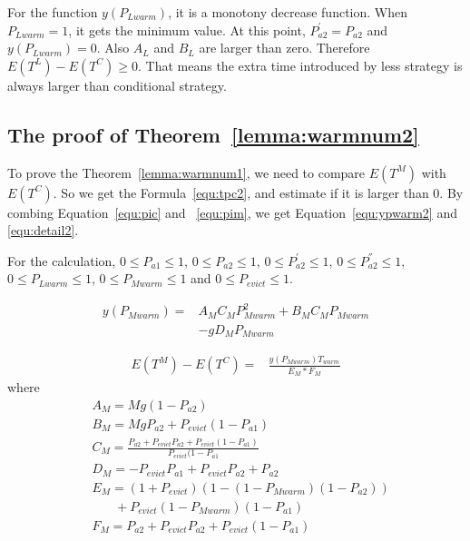 For the function $y(P_{Lwarm})$, it is a monotony decrease function. When $P_{Lwarm} = 1$, it gets the minimum value.
At this point, $P_{a2}^{'} = P_{a2}$ and $y(P_{Lwarm}) = 0$.
Also $A_{L}$ and $B_{L}$ are larger than zero.
Therefore $E(T^{L}) - E(T^{C})\geq 0$.
That means the extra time introduced by less {\vwarm} strategy is always larger than conditional {\vwarm} strategy.

\subsection{The proof of Theorem~\ref{lemma:warmnum2}}
To prove the Theorem~\ref{lemma:warmnum1}, we need to compare $E(T^{M})$ with $E(T^{C})$.
So we get the Formula~\ref{equ:tpc2}, and estimate if it is larger than $0$.
By combing Equation~\ref{equ:pic} and ~\ref{equ:pim}, we get Equation~\ref{equ:ypwarm2} and \ref{equ:detail2}.

For the calculation, $0 \leq P_{a1} \leq 1$, $0 \leq P_{a2} \leq 1$, $0 \leq P_{a2}^{'} \leq 1$, $0 \leq P_{a2}^{''} \leq 1$, $0 \leq P_{Lwarm} \leq 1$, $0 \leq P_{Mwarm} \leq 1$
 and $0 \leq P_{evict} \leq 1$.

\begin{equation}
\label{equ:ypwarm2}
\begin{split}
y(P_{Mwarm}) = & A_{M}C_{M}P_{Mwarm}^2+B_{M}C_{M}P_{Mwarm} \\
&-gD_{M}P_{Mwarm} \,
\end{split}\end{equation}

\begin{equation}
\label{equ:detail2}
\begin{split}
E(T^{M}) - E(T^{C}) = &\frac{y(P_{Mwarm})T_{warm}}{E_{M}*F_{M}}
\end{split}\end{equation}
where
\begin{equation*}
\begin{split}
&A_{M}= Mg(1-P_{a2})\\
&B_{M}=MgP_{a2}+P_{evict}(1-P_{a1})\\
&C_{M}=\frac{P_{a2}+P_{evict}P_{a2}+P_{evict}(1-P_{a1})}{P_{evict}(1-P_{a1}}\\
&D_{M}=-P_{evict}P_{a1}+P_{evict}P_{a2}+P_{a2}\\
&E_{M}=(1+P_{evict})(1-(1-P_{Mwarm})(1-P_{a2})) \\& \ \ \ \ \ \ \ \ +P_{evict}(1-P_{Mwarm})(1-P_{a1})\\
&F_{M}=P_{a2}+P_{evict}P_{a2}+P_{evict}(1-P_{a1})
\end{split}\end{equation*}

